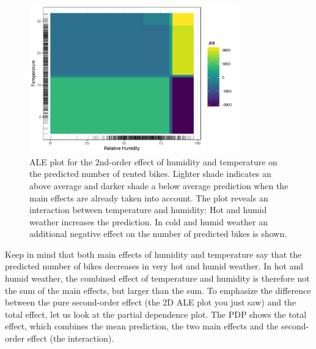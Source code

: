 \documentclass[
  10pt,
]{scrbook}
\begin{document}
\begin{figure}

{\centering \includegraphics[width=0.8\textwidth]{images/ale-bike-2d-1} 

}

\caption{ALE plot for the 2nd-order effect of humidity and temperature on the predicted number of rented bikes. Lighter shade indicates an above average and darker shade a below average prediction when the main effects are already taken into account. The plot reveals an interaction between temperature and humidity: Hot and humid weather increases the prediction. In cold and humid weather an additional negative effect on the number of predicted bikes is shown.}\label{fig:ale-bike-2d}
\end{figure}

Keep in mind that both main effects of humidity and temperature say that the predicted number of bikes decreases in very hot and humid weather.
In hot and humid weather, the combined effect of temperature and humidity is therefore not the sum of the main effects, but larger than the sum.
To emphasize the difference between the pure second-order effect (the 2D ALE plot you just saw) and the total effect, let us look at the partial dependence plot.
The PDP shows the total effect, which combines the mean prediction, the two main effects and the second-order effect (the interaction).
\end{document}

